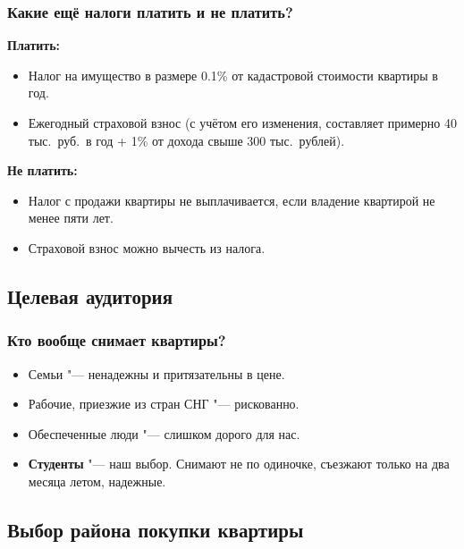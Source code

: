 \documentclass{beamer}
\begin{document}
		\begin{frame}
			\frametitle{Какие ещё налоги платить и не платить?}
			
			\textbf{Платить:}
			\begin{itemize}
			
			\item Налог на имущество в размере 0.1\% от кадастровой стоимости квартиры в год.
			
			\item Ежегодный страховой взнос (с учётом его изменения, составляет примерно 40 тыс.\ руб.\ в год + 1\% от дохода свыше 300 тыс.\ рублей).
			
			\end{itemize}
		
			\textbf{Не платить:}
			\begin{itemize}
			
			\item Налог с продажи квартиры не выплачивается, если владение квартирой не менее пяти лет.
			
			\item Страховой взнос можно вычесть из налога.
			
			\end{itemize}
					
		\end{frame}
		
	\subsection{Целевая аудитория}
	
		\begin{frame}
			\frametitle{Кто вообще снимает квартиры?}
			
				\begin{itemize}
					\item Семьи "--- ненадежны и притязательны в цене.
					\item Рабочие, приезжие из стран СНГ "--- рискованно.
					\item Обеспеченные люди "--- слишком дорого для нас.
					\item \textbf{Студенты} "--- наш выбор.
							Снимают не по одиночке, съезжают только на два месяца летом, надежные.
				\end{itemize}
			
		\end{frame}
		
	
	\subsection{Выбор района покупки квартиры}
	
\end{document}
